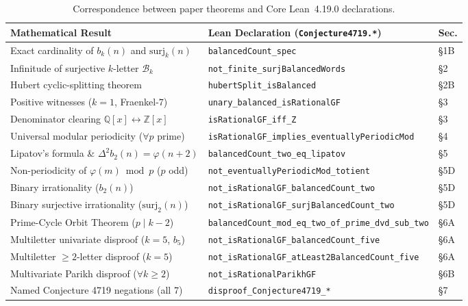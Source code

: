 \documentclass[11pt,a4paper]{article}
\theoremstyle{definition}
\newcommand{\Z}{\mathbb{Z}}
\newcommand{\Q}{\mathbb{Q}}
\newcommand{\surj}{\mathrm{surj}}
\begin{document}
\begin{table}[htbp]
\centering
\footnotesize
\begin{tabular}{@{}lll@{}}
\hline
\textbf{Mathematical Result} & \textbf{Lean Declaration (\texttt{Conjecture4719.*})} & \textbf{Sec.} \\
\hline
Exact cardinality of $b_k(n)$ and $\surj_k(n)$ & \texttt{balancedCount\_spec} & \S1B \\
Infinitude of surjective $k$-letter $\mathcal{B}_k$ & \texttt{not\_finite\_surjBalancedWords} & \S2 \\
Hubert cyclic-splitting theorem & \texttt{hubertSplit\_isBalanced} & \S2B \\
Positive witnesses ($k=1$, Fraenkel-$7$) & \texttt{unary\_balanced\_isRationalGF} & \S3 \\
Denominator clearing $\Q[x] \leftrightarrow \Z[x]$ & \texttt{isRationalGF\_iff\_Z} & \S3 \\
Universal modular periodicity ($\forall p$ prime) & \texttt{isRationalGF\_implies\_eventuallyPeriodicMod} & \S4 \\
Lipatov's formula \& $\Delta^2 b_2(n) = \varphi(n+2)$ & \texttt{balancedCount\_two\_eq\_lipatov} & \S5 \\
Non-periodicity of $\varphi(m) \bmod p$ ($p$ odd) & \texttt{not\_eventuallyPeriodicMod\_totient} & \S5D \\
Binary irrationality ($b_2(n)$) & \texttt{not\_isRationalGF\_balancedCount\_two} & \S5D \\
Binary surjective irrationality ($\surj_2(n)$) & \texttt{not\_isRationalGF\_surjBalancedCount\_two} & \S5D \\
Prime-Cycle Orbit Theorem ($p \mid k - 2$) & \texttt{balancedCount\_mod\_eq\_two\_of\_prime\_dvd\_sub\_two} & \S6A \\
Multiletter univariate disproof ($k = 5$, $b_5$) & \texttt{not\_isRationalGF\_balancedCount\_five} & \S6A \\
Multiletter $\ge 2$-letter disproof ($k = 5$) & \texttt{not\_isRationalGF\_atLeast2BalancedCount\_five} & \S6A \\
Multivariate Parikh disproof ($\forall k \ge 2$) & \texttt{not\_isRationalParikhGF} & \S6B \\
Named Conjecture 4719 negations (all 7) & \texttt{disproof\_Conjecture4719\_*} & \S7 \\
\hline
\end{tabular}
\caption{Correspondence between paper theorems and Core Lean~4.19.0 declarations.}
\label{tab:lean-map}
\end{table}
\end{document}
